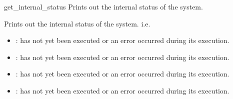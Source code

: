 \begin{nusmvCommand} {get\_internal\_status} {Prints out the internal status of the system.}


Prints out the internal status of the system. i.e.
\begin{itemize}
\item {}:  has not yet been executed or
  an error occurred during its execution.
\item  {}:  has not yet been
  executed or an error occurred during its execution.
\item  {}:  has not yet been executed
  or an error occurred during its execution.
\item  {}:  has not yet been executed or
  an error occurred during its execution.
\end{itemize}

\end{nusmvCommand}
